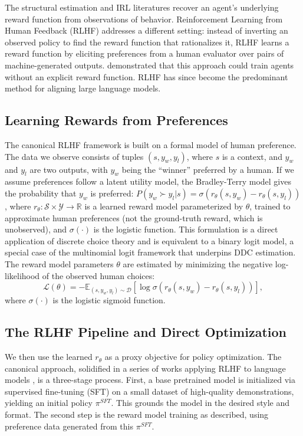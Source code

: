 The structural estimation and IRL literatures recover an agent's underlying reward function from observations of behavior. Reinforcement Learning from Human Feedback (RLHF) addresses a different setting: instead of inverting an observed policy to find the reward function that rationalizes it, RLHF learns a reward function by eliciting preferences from a human evaluator over pairs of machine-generated outputs. \citet{christiano:2017} demonstrated that this approach could train agents without an explicit reward function. RLHF has since become the predominant method for aligning large language models.

\subsection{Learning Rewards from Preferences}

The canonical RLHF framework is built on a formal model of human preference. The data we observe consists of tuples $(s, y_w, y_l)$, where $s$ is a context, and $y_w$ and $y_l$ are two outputs, with $y_w$ being the ``winner'' preferred by a human. If we assume preferences follow a latent utility model, the Bradley-Terry model gives the probability that $y_w$ is preferred: $P(y_w \succ y_l | s) = \sigma(r_\theta(s, y_w) - r_\theta(s, y_l))$, where $r_\theta: \mathcal{S} \times \mathcal{Y} \to \mathbb{R}$ is a learned reward model parameterized by $\theta$, trained to approximate human preferences (not the ground-truth reward, which is unobserved), and $\sigma(\cdot)$ is the logistic function. This formulation is a direct application of discrete choice theory and is equivalent to a binary logit model, a special case of the multinomial logit framework \citep{mcfadden:1973} that underpins DDC estimation. The reward model parameters $\theta$ are estimated by minimizing the negative log-likelihood of the observed human choices:
\begin{equation}
    \mathcal{L}(\theta) = -\mathbb{E}_{(s, y_w, y_l) \sim \mathcal{D}} \left[ \log \sigma \left( r_\theta(s, y_w) - r_\theta(s, y_l) \right) \right],
\label{eq:rlhf_loss}
\end{equation}
where $\sigma(\cdot)$ is the logistic sigmoid function.

\subsection{The RLHF Pipeline and Direct Optimization}

We then use the learned $r_\theta$ as a proxy objective for policy optimization. The canonical approach, solidified in a series of works applying RLHF to language models \citep{ziegler2019fine,stiennon2020learning,ouyang2022training}, is a three-stage process. First, a base pretrained model is initialized via supervised fine-tuning (SFT) on a small dataset of high-quality demonstrations, yielding an initial policy $\pi^{SFT}$. This grounds the model in the desired style and format. The second step is the reward model training as described, using preference data generated from this $\pi^{SFT}$.

